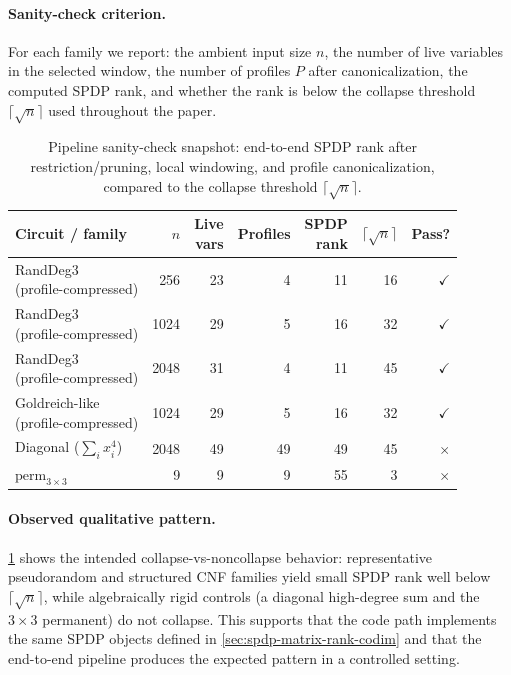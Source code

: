 \documentclass[12pt]{article}
\theoremstyle{definition}
\theoremstyle{remark}
\DeclareMathOperator{\rank}{rank}
\begin{document}
\paragraph{Sanity-check criterion.}
For each family we report: the ambient input size $n$, the number of
live variables in the selected window, the number of profiles $P$ after
canonicalization, the computed SPDP rank, and whether the rank is below
the collapse threshold $\lceil\sqrt{n}\rceil$ used throughout the paper.

\begin{table}[H]
\centering
\caption{Pipeline sanity-check snapshot: end-to-end SPDP rank after
restriction/pruning, local windowing, and profile canonicalization,
compared to the collapse threshold $\lceil\sqrt{n}\rceil$.}
\label{tab:pipeline-sanity}
\begin{tabular}{lrrrrrr}
\toprule
Circuit / family & $n$ & \shortstack{Live\\vars} & Profiles & \shortstack{SPDP\\rank} & $\lceil\sqrt{n}\rceil$ & Pass? \\
\midrule
\shortstack[l]{RandDeg3\\(profile-compressed)}          &  256  & 23 &  4 & 11 & 16 & $\checkmark$ \\
\shortstack[l]{RandDeg3\\(profile-compressed)}          & 1024  & 29 &  5 & 16 & 32 & $\checkmark$ \\
\shortstack[l]{RandDeg3\\(profile-compressed)}          & 2048  & 31 &  4 & 11 & 45 & $\checkmark$ \\
\shortstack[l]{Goldreich-like\\(profile-compressed)}    & 1024  & 29 &  5 & 16 & 32 & $\checkmark$ \\
Diagonal ($\sum_i x_i^4$)              & 2048  & 49 & 49 & 49 & 45 & $\times$ \\
$\mathrm{perm}_{3\times 3}$            &    9  &  9 &  9 & 55 &  3 & $\times$ \\
\bottomrule
\end{tabular}
\end{table}

\paragraph{Observed qualitative pattern.}
\ref{tab:pipeline-sanity} shows the intended collapse-vs-noncollapse
behavior: representative pseudorandom and structured CNF families yield small
SPDP rank well below $\lceil\sqrt{n}\rceil$, while algebraically rigid
controls (a diagonal high-degree sum and the $3\times 3$ permanent) do
not collapse. This supports that the code path implements the same SPDP
objects defined in \ref{sec:spdp-matrix-rank-codim} and that the end-to-end
pipeline produces the expected pattern in a controlled setting.
\end{document}
